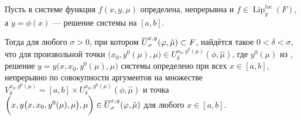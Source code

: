\begin{theorem}
    Пусть в системе  функция $ f(x, y, \mu) $ определена, непрерывна и $ f \in \operatorname{Lip}_y^{loc}(F) $, а $ y = \phi(x) $ --- решение системы  на $ [a, b] $.

    Тогда для любого $ \sigma > 0 $, при котором $ \overline U_\sigma^{x, y} (\varphi, \hat \mu) \subset F $, найдётся такое $ 0 < \delta < \sigma $, что для произвольной точки $ \big( x_0, y^0(\mu), \mu \big) \in U_\delta^{x_0, y^0(\mu)}(\phi, \hat \mu) $, где $ y^0(\mu) $ из , решение $ y = y \big( x, x_0, y^0(\mu), \mu \big) $ системы  определено при всех $ x \in [a, b] $, непрерывно по совокупности аргументов на множестве $ V_\delta^{x_0, y^0(\mu)} = [a, b] \times U_\delta^{x_0, y^0(\mu)}(\phi, \hat \mu) $ и точка $ \bigg( x, y \big( x, x_0, y^0(\mu), \mu \big), \mu \bigg) \in \overline U_\sigma^{x, y}(\varphi, \hat \mu) $ для любого $ x \in [a, b] $.
\end{theorem}

